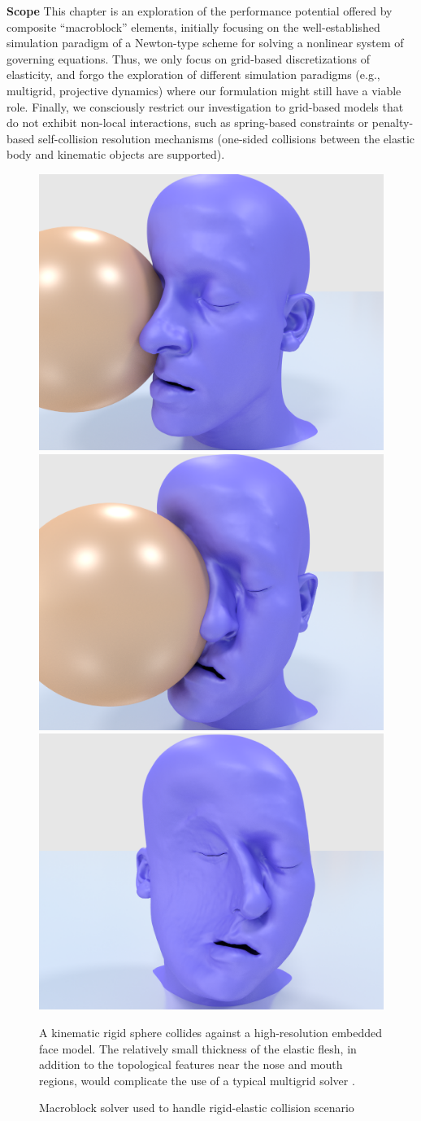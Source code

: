  \textbf{Scope} This chapter is an exploration of the performance
 potential offered by composite ``macroblock'' elements, initially
 focusing on the well-established simulation paradigm of a Newton-type
 scheme for solving a nonlinear system of governing equations. Thus,
 we only focus on grid-based discretizations of elasticity, and forgo
 the exploration of different simulation paradigms (e.g., multigrid,
 projective dynamics) where our formulation might still have a viable
 role.  Finally, we consciously restrict our investigation to
 grid-based models that do not exhibit non-local interactions, such as
 spring-based constraints or penalty-based self-collision resolution
 mechanisms (one-sided collisions between the elastic body and
 kinematic objects are supported).



\begin{figure}
\begin{center}
\includegraphics[width=.32\textwidth]{chapter_macroblocks/images/face_smash1.png}
\includegraphics[width=.32\textwidth]{chapter_macroblocks/images/face_smash2.png}
\includegraphics[width=.32\textwidth]{chapter_macroblocks/images/face_smash3.png} \end{center}
\vspace{-.05in}
\caption{Macroblock solver used to handle rigid-elastic collision
  scenario }{A kinematic rigid sphere collides against a
  high-resolution embedded face model. The relatively small thickness
  of the elastic flesh, in addition to the topological features near
  the nose and mouth regions, would complicate the use of a typical
  multigrid solver \cite{McAdaZSETTS:2011} .}
\vspace{-.15in} \label{fig:macroblocks:face-smash-example}
 \end{figure}

